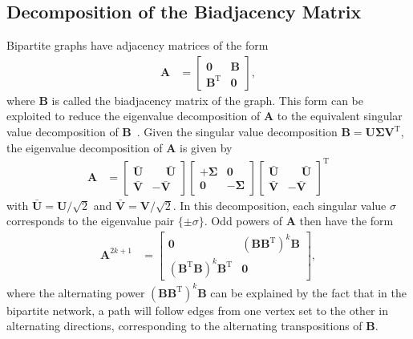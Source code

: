 \documentclass[11pt,a4paper]{book}
\begin{document}
\subsection{Decomposition of the Biadjacency Matrix}
Bipartite graphs have adjacency matrices of the form 
\begin{align}
  \mathbf A &= \left[ \begin{array}{cc} \mathbf 0^{\phantom {\mathrm T}}
      & \mathbf B \\ \mathbf 
      B^{\mathrm T} & \mathbf 0 \end{array} \right], 
\end{align}
where $\mathbf B$ is called the biadjacency matrix of the graph.  This form can be
exploited to reduce the eigenvalue decomposition of $\mathbf A$ to the equivalent
singular value decomposition of $\mathbf B$~\cite{b614}. 
Given the singular value
decomposition $\mathbf B = \mathbf U \mathbf \Sigma \mathbf
V^{\mathrm T}$, the eigenvalue decomposition of $\mathbf A$ is given by
\begin{align}
  \mathbf A &=
  \left[ \begin{array}{cc} \mathbf {\bar U} & {\phantom -}\mathbf
      {\bar U} \\ \mathbf {\bar V} & -\mathbf {\bar V} \end{array} \right] 
  \left[ \begin{array}{cc} +\mathbf \Sigma & \mathbf 0 \\ \mathbf 0 &
      -\mathbf \Sigma \end{array} \right] 
  \left[ \begin{array}{cc} \mathbf {\bar U} & {\phantom -}\mathbf
      {\bar U} \\ \mathbf {\bar V} & -\mathbf {\bar V} \end{array}
    \right]^{\mathrm T}  
\end{align}
with $\mathbf {\bar U} =\mathbf U/\sqrt 2$ and $\mathbf {\bar V} =
\mathbf V/\sqrt 2$.
In this decomposition, 
each singular value $\sigma$ corresponds to the eigenvalue pair $\{\pm
\sigma\}$.  
Odd powers of $\mathbf A$ then have the form
\begin{align*}
  \mathbf A^{2k+1} &= \left[ \begin{array}{cc} 
      \mathbf 0 & (\mathbf B \mathbf B^{\mathrm T})^k \mathbf B \\
      (\mathbf B^{\mathrm T} \mathbf B)^k \mathbf B^{\mathrm T} &
      \mathbf 0 
    \end{array} \right],
\end{align*}
where the alternating power $(\mathbf B \mathbf B^{\mathrm T})^k \mathbf
B$ can be explained by the fact that in the bipartite network, a path
will follow edges from one vertex set to the other in alternating
directions, corresponding to the alternating transpositions of $\mathbf
B$. 
\end{document}
